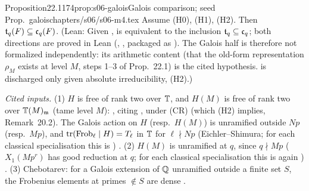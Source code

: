 \begin{quoted}{Proposition}{22.1}{174}{prop:s06-galois}{Galois comparison; seed Prop.~galois}{chapters/s06/s06-m4.tex}\label{rpt:prop:s06-galois}
Assume (H0), (H1), (H2). Then $\mathfrak{t}_q(F)\subseteq\mathfrak{c}_q(F)$. \stpmc{}
(Lean: Given ,  is equivalent to the inclusion $\mathfrak{t}_q\subseteq\mathfrak{c}_q$; both directions are proved in Lean (, , packaged as ). The Galois half is therefore not formalized independently: its arithmetic content (that the old-form representation $\rho_M$ exists at level $M$, steps 1--3 of Prop.~22.1) is the cited hypothesis.  is discharged only given absolute irreducibility, (H2).)
\par\smallskip{}\par
\noindent\emph{Cited inputs.}
(1) $H$ is free of rank two over $\mathbb{T}$, and $H(M)$ is free of rank two over $\mathbb{T}(M)_{\mathfrak{m}}$ (tame level $M$):
\cite[\S7.2, p.~68]{Hs} \cite[\S7.2, proof of Lemma 7.4, p.~68]{Hs}
\stcited, citing \cite[Cor.~1, 2, p.~482]{Wi95}
\cite[Thm 2.1, Cor.~1, Cor.~2, p.~482]{Wi95}, under (CR) (which (H2)
implies, Remark~20.2). The Galois action on $H$ (resp.\ $H(M)$) is unramified outside $Np$ (resp.\ $Mp$), and
$\operatorname{tr}(\mathrm{Frob}_\ell\mid H)=T_\ell$ in $\mathbb{T}$ for $\ell\nmid Np$ (Eichler--Shimura; for each classical specialisation this is
\cite[Thm 3.1(a), p.~85]{DDT97}) \stcited.
(2) $H(M)$ is unramified at $q$, since $q\nmid Mp$ ($X_1(Mp^r)$ has good reduction at $q$; for each classical specialisation this is
again \cite[Thm 3.1(a), p.~85]{DDT97}) \stknown.
(3) Chebotarev: for a Galois extension of $\mathbb{Q}$ unramified outside a finite set $S$, the Frobenius elements at primes $\notin S$ are
dense \cite[Thm 2.3, p.~52]{DDT97} \stknown.
\end{quoted}
